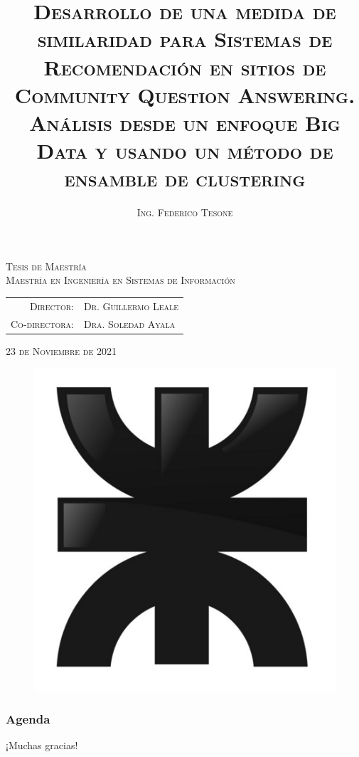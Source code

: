 \documentclass[10pt]{beamer}
\title[]{\textsc{Desarrollo de una medida de similaridad para Sistemas de Recomendación en sitios de Community Question Answering. Análisis desde un enfoque Big Data y usando un método de ensamble de clustering}} %
\author{\textsc{Ing. Federico Tesone}} %
\date{}
\begin{document}
	\begin{frame}[plain]
		 \titlepage{}
		 \date{}

		 \vspace{-45px}

 		\begin{center}
			{\textsc{\textbf\scriptsize Tesis de Maestría}} \\[-5px]
			{\textsc{\tiny Maestría en Ingeniería en Sistemas de Información}} \\
		\end{center}

		\vspace{3px}

		\begin{center}
			\begin{scriptsize}
				\begin{tabular}{rl}
					\textsc{Director:} & \textsc{Dr. Guillermo Leale} \\
					\textsc{Co-directora:} & \textsc{Dra. Soledad Ayala}
				\end{tabular}
			\end{scriptsize}
		\end{center}

 		\begin{center}
			{\tiny \textsc{23 de Noviembre de 2021}}
		\end{center}

		\begin{figure}
			\includegraphics[width=0.1\linewidth]{../imagenes/portada/logoUTN.png}
		\end{figure}
	\end{frame}

	\begin{frame}
		\frametitle{Agenda}
		\tableofcontents[hideallsubsections]
	\end{frame}

	\beamerdefaultoverlayspecification{<+>}

	
	
	
	
	
	
	

	\begin{frame}
		\Huge{\centerline{¡Muchas gracias!}}
	\end{frame}
\end{document}
